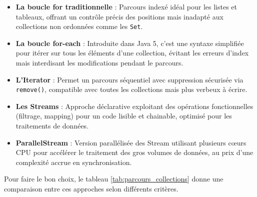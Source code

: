 \documentclass[12pt,a4paper]{report}
\begin{document}
	\begin{itemize}
		
		\item \textbf{La boucle for traditionnelle} : Parcours indexé idéal pour les listes et tableaux, offrant un contrôle précis des positions mais inadapté aux collections non ordonnées comme les \verb|Set|.
		
		\item \textbf{La boucle for-each} : Introduite dans Java 5, c'est une syntaxe simplifiée pour itérer sur tous les éléments d'une collection, évitant les erreurs d'index mais interdisant les modifications pendant le parcours.
		
		\item \textbf{L'Iterator} : Permet un parcours séquentiel avec suppression sécurisée via \verb|remove()|, compatible avec toutes les collections mais plus verbeux à écrire.
		
		\item \textbf{Les Streams} : Approche déclarative exploitant des opérations fonctionnelles (filtrage, mapping) pour un code lisible et chainable, optimisé pour les traitements de données. \cite{stream}
		
		\item \textbf{ParallelStream} : Version parallélisée des Stream utilisant plusieurs cœurs CPU pour accélérer le traitement des gros volumes de données, au prix d'une complexité accrue en synchronisation.
		
	\end{itemize}
	
	Pour faire le bon choix, le tableau \ref{tab:parcours_collections} donne une comparaison entre ces approches selon différents critères.
	
\end{document}
